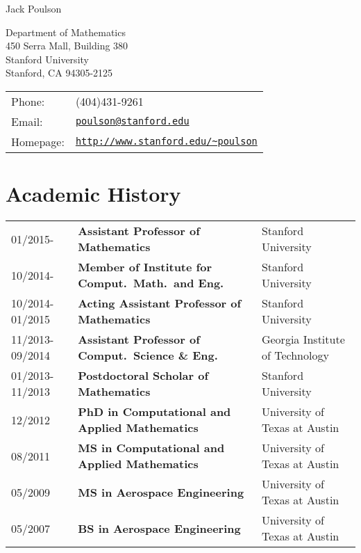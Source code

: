 \documentclass[letterpaper]{article}
\def\name{Jack Poulson}
\begin{document}
{\huge \name}

\vspace{0.25in}

\begin{minipage}{0.45\linewidth}
  Department of Mathematics \\
  450 Serra Mall, Building 380 \\
  Stanford University \\
  Stanford, CA 94305-2125
\end{minipage}
\begin{minipage}{0.45\linewidth}
  \begin{tabular}{ll}
    Phone:&(404)431-9261 \\
    Email:&\href{mailto:poulson@stanford.edu}{\tt poulson@stanford.edu} \\
    Homepage: & \href{http://www.stanford.edu/~poulson}{\tt http://www.stanford.edu/\textasciitilde poulson} \\
  \end{tabular}
\end{minipage}

\section*{Academic History}

\begin{tabular}{lll}
01/2015-        & {\bf Assistant Professor of Mathematics}               & Stanford University \\
10/2014-        & {\bf Member of Institute for Comput.\ Math.\ and Eng.} & Stanford University \\
10/2014-01/2015 & {\bf Acting Assistant Professor of Mathematics}        & Stanford University \\
11/2013-09/2014 & {\bf Assistant Professor of Comput.\ Science \& Eng. } & Georgia Institute of Technology \\
01/2013-11/2013 & {\bf Postdoctoral Scholar of Mathematics}              & Stanford University \\
12/2012         & {\bf PhD in Computational and Applied Mathematics}     & University of Texas at Austin \\
08/2011         & {\bf MS in Computational and Applied Mathematics}      & University of Texas at Austin \\
05/2009         & {\bf MS in Aerospace Engineering}                      & University of Texas at Austin \\
05/2007         & {\bf BS in Aerospace Engineering}                      & University of Texas at Austin \\
\end{tabular}
\end{document}
